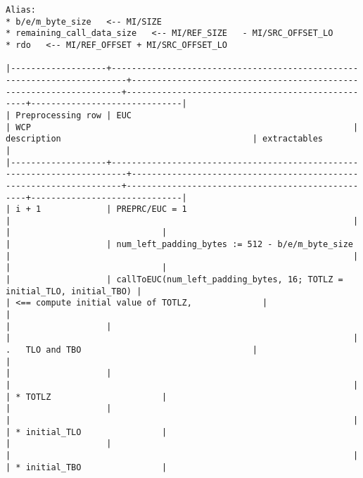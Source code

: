 \documentclass[varwidth=\maxdimen,margin=0.5cm,multi={verbatim}]{standalone}
\begin{document}
\begin{verbatim}
Alias:
* b/e/m_byte_size   <-- MI/SIZE
* remaining_call_data_size   <-- MI/REF_SIZE   - MI/SRC_OFFSET_LO
* rdo   <-- MI/REF_OFFSET + MI/SRC_OFFSET_LO

|-------------------+-------------------------------------------------------------------------+--------------------------------------------------------------------+--------------------------------------------------+------------------------------|
| Preprocessing row | EUC                                                                     | WCP                                                                | description                                      | extractables                 |
|-------------------+-------------------------------------------------------------------------+--------------------------------------------------------------------+--------------------------------------------------+------------------------------|
| i + 1             | PREPRC/EUC = 1                                                          |                                                                    |                                                  |                              |
|                   | num_left_padding_bytes := 512 - b/e/m_byte_size                         |                                                                    |                                                  |                              |
|                   | callToEUC(num_left_padding_bytes, 16; TOTLZ = initial_TLO, initial_TBO) |                                                                    | <== compute initial value of TOTLZ,              |                              |
|                   |                                                                         |                                                                    | .   TLO and TBO                                  |                              |
|                   |                                                                         |                                                                    |                                                  | * TOTLZ                      |
|                   |                                                                         |                                                                    |                                                  | * initial_TLO                |
|                   |                                                                         |                                                                    |                                                  | * initial_TBO                |

\end{verbatim}
\end{document}
